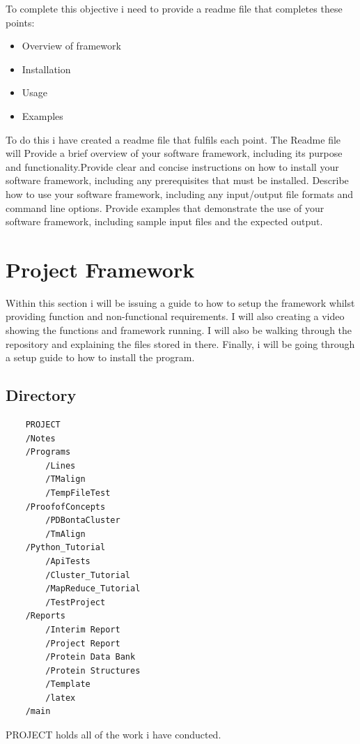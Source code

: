 \documentclass[]{final_report}
\begin{document}
To complete this objective i need to provide a readme file that completes these points:

\begin{itemize}
    \item Overview of framework
    \item Installation
    \item Usage
    \item Examples
\end{itemize}

To do this i have created a readme file that fulfils each point. The Readme file will Provide a brief overview of your software framework, including its purpose and functionality.Provide clear and concise instructions on how to install your software framework, including any prerequisites that must be installed. Describe how to use your software framework, including any input/output file formats and command line options. Provide examples that demonstrate the use of your software framework, including sample input files and the expected output.

\section{Project Framework}
Within this section i will be issuing a guide to how to setup the framework whilst providing function and non-functional requirements. I will also creating a video showing the functions and framework running. I will also be walking through the repository and explaining the files stored in there. Finally, i will be going through a setup guide to how to install the program.


\subsection{Directory}

\begin{lstlisting}
    PROJECT
    /Notes
    /Programs
        /Lines
        /TMalign
        /TempFileTest
    /ProofofConcepts
        /PDBontaCluster
        /TmAlign
    /Python_Tutorial
        /ApiTests
        /Cluster_Tutorial
        /MapReduce_Tutorial
        /TestProject
    /Reports
        /Interim Report
        /Project Report
        /Protein Data Bank
        /Protein Structures
        /Template
        /latex
    /main
\end{lstlisting}

PROJECT holds all of the work i have conducted. 
\end{document}

